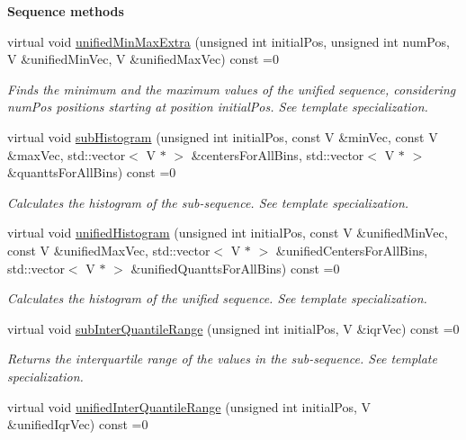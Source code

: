 \begin{Indent}{\bf Sequence methods}
\begin{DoxyCompactItemize}
virtual void \hyperlink{class_q_u_e_s_o_1_1_base_vector_sequence_a2d6cd9b93580715762318b51edbd9463}{unified\-Min\-Max\-Extra} (unsigned int initial\-Pos, unsigned int num\-Pos, V \&unified\-Min\-Vec, V \&unified\-Max\-Vec) const =0
\begin{DoxyCompactList}\small\item\em Finds the minimum and the maximum values of the unified sequence, considering {\ttfamily num\-Pos} positions starting at position {\ttfamily initial\-Pos}. See template specialization. \end{DoxyCompactList}\item 
virtual void \hyperlink{class_q_u_e_s_o_1_1_base_vector_sequence_a66c6af1f9a509720264d121b408a45f3}{sub\-Histogram} (unsigned int initial\-Pos, const V \&min\-Vec, const V \&max\-Vec, std\-::vector$<$ V $\ast$ $>$ \&centers\-For\-All\-Bins, std\-::vector$<$ V $\ast$ $>$ \&quantts\-For\-All\-Bins) const =0
\begin{DoxyCompactList}\small\item\em Calculates the histogram of the sub-\/sequence. See template specialization. \end{DoxyCompactList}\item 
virtual void \hyperlink{class_q_u_e_s_o_1_1_base_vector_sequence_a04653bd3bd8b9c29ae6d03a2eb0b3779}{unified\-Histogram} (unsigned int initial\-Pos, const V \&unified\-Min\-Vec, const V \&unified\-Max\-Vec, std\-::vector$<$ V $\ast$ $>$ \&unified\-Centers\-For\-All\-Bins, std\-::vector$<$ V $\ast$ $>$ \&unified\-Quantts\-For\-All\-Bins) const =0
\begin{DoxyCompactList}\small\item\em Calculates the histogram of the unified sequence. See template specialization. \end{DoxyCompactList}\item 
virtual void \hyperlink{class_q_u_e_s_o_1_1_base_vector_sequence_a62cb96f153a8608ef1727265a734aacb}{sub\-Inter\-Quantile\-Range} (unsigned int initial\-Pos, V \&iqr\-Vec) const =0
\begin{DoxyCompactList}\small\item\em Returns the interquartile range of the values in the sub-\/sequence. See template specialization. \end{DoxyCompactList}\item 
virtual void \hyperlink{class_q_u_e_s_o_1_1_base_vector_sequence_a49b50dfef9bf3475eb681855268c050d}{unified\-Inter\-Quantile\-Range} (unsigned int initial\-Pos, V \&unified\-Iqr\-Vec) const =0

\end{DoxyCompactItemize}
\end{Indent}
